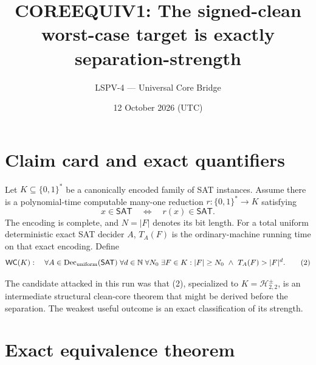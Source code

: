 \documentclass[11pt]{article}
\title{COREEQUIV1: The signed-clean worst-case target is exactly separation-strength}
\author{LSPV-4 --- Universal Core Bridge}
\date{12 October 2026 (UTC)}
\newcommand{\SAT}{\mathsf{SAT}}
\newcommand{\Hsigned}{\mathcal H^{\pm}_{2,2}}
\begin{document}
\maketitle

\begin{center}
\end{center}

\section{Claim card and exact quantifiers}

Let $K\subseteq\{0,1\}^*$ be a canonically encoded family of SAT instances.
Assume there is a polynomial-time computable many-one reduction
$r:\{0,1\}^*\to K$ satisfying
\[
 x\in\SAT\quad\Longleftrightarrow\quad r(x)\in\SAT.       \tag{1}
\]
The encoding is complete, and $N=|F|$ denotes its bit length.  For a total
uniform deterministic exact SAT decider $A$, $T_A(F)$ is the ordinary-machine
running time on that exact encoding.  Define
\begin{equation}
 \mathsf{WC}(K):\quad
 \forall A\in\operatorname{Dec}_{\rm uniform}(\SAT)\;
 \forall d\in\mathbb N\;\forall N_0\;\exists F\in K:
 |F|\ge N_0\ \land\ T_A(F)>|F|^d .                       \tag{2}
\end{equation}

The candidate attacked in this run was that (2), specialized to
$K=\Hsigned$, is an intermediate structural clean-core theorem that might be
derived before the separation.  The weakest useful outcome is an exact
classification of its strength.

\section{Exact equivalence theorem}
\end{document}
